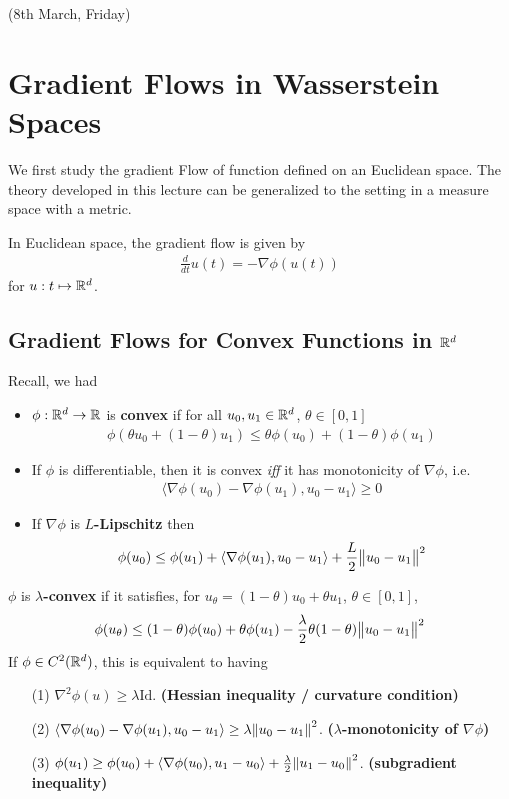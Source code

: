 \documentclass[12pt,a4paper]{article}
\begin{document}
\newday

(8th March, Friday)
\s

\section{Gradient Flows in Wasserstein Spaces}

We first study the gradient Flow of function defined on an Euclidean space. The theory developed in this lecture can be generalized to the setting in a measure space with a metric.
\s

In Euclidean space, the gradient flow is given by
\begin{align*}
\frac{d}{dt} u(t) = - \nabla \phi(u(t))
\end{align*}
for $u: t\mapsto \mathbb{R}^d$.
\s

\subsection{Gradient Flows for Convex Functions in $\mathbb{R}^d$}

Recall, we had
\begin{itemize}
\item $\phi : \mathbb{R}^d \rightarrow \mathbb{R}$ is \textbf{convex} if for all $u_0, u_1 \in \mathbb{R}^d$, $\theta \in [0,1]$
\begin{align*}
\phi(\theta u_0 + (1-\theta) u_1) \leq \theta \phi(u_0) + (1-\theta)\phi(u_1)
\end{align*}
\item If $\phi$ is differentiable, then it is convex \emph{iff} it has monotonicity of $\nabla \phi$, i.e.
\begin{align*}
\langle \nabla \phi(u_0) - \nabla \phi(u_1), u_0 -u_1 \rangle \geq 0
\end{align*}
\item If $\nabla \phi$ is \textbf{$L$-Lipschitz} then
\begin{align*}
\phi(u_0) \leq \phi(u_1) + \langle \nabla \phi(u_1), u_0 - u_1 \rangle + \frac{L}{2} \bigl\lVert u_0 -u_1\bigr\rVert_{}^2
\end{align*}
\end{itemize}

 $\phi$ is \textbf{$\lambda$-convex} if it satisfies, for $u_{\theta} = (1-\theta)u_0 + \theta u_1$, $\theta \in [0,1]$,
\begin{align*}
\phi(u_{\theta}) \leq (1- \theta)\phi(u_0) + \theta \phi(u_1) - \frac{\lambda}{2} \theta(1-\theta)\bigl\lVert u_0 -u_1\bigr\rVert_{}^2
\end{align*}
If $\phi \in C^2(\mathbb{R}^d)$, this is equivalent to having
\begin{itemize}
\item[(1)] $\nabla^2 \phi (u) \geq \lambda \text{Id}$. \textbf{(Hessian inequality / curvature condition)}
\item[(2)] $\langle \nabla \phi(u_0) - \nabla  \phi(u_1), u_0 - u_1 \rangle \geq \lambda \snorms{u_0 - u_1}{}^2$. \textbf{($\lambda$-monotonicity of $\nabla \phi$)}
\item[(3)] $\phi(u_1) \geq \phi(u_0) + \langle \nabla \phi(u_0), u_1 - u_0 \rangle + \frac{\lambda}{2} \snorms{u_1 -u_0}{}^2$. \textbf{(subgradient inequality)}
\end{itemize}
\end{document}
